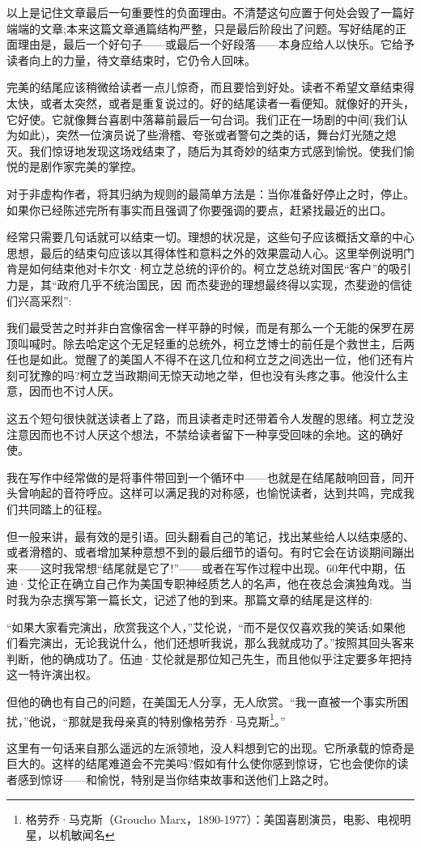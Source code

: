 以上是记住文章最后一句重要性的负面理由。不清楚这句应置于何处会毁了一篇好端端的文章;本来这篇文章通篇结构严整，只是最后阶段出了问题。写好结尾的正面理由是，最后一个好句子——或最后一个好段落——本身应给人以快乐。它给予读者向上的力量，待文章结束时，它仍令人回味。

完美的结尾应该稍微给读者一点儿惊奇，而且要恰到好处。读者不希望文章结束得太快，或者太突然，或者是重复说过的。好的结尾读者一看便知。就像好的开头，它好使。它就像舞台喜剧中落幕前最后一句台词。我们正在一场剧的中间(我们认为如此)，突然一位演员说了些滑稽、夸张或者警句之类的话，舞台灯光随之熄灭。我们惊讶地发现这场戏结束了，随后为其奇妙的结束方式感到愉悦。使我们愉悦的是剧作家完美的掌控。

对于非虚构作者，将其归纳为规则的最简单方法是：当你准备好停止之时，停止。如果你已经陈述完所有事实而且强调了你要强调的要点，赶紧找最近的出口。

经常只需要几句话就可以结束一切。理想的状况是，这些句子应该概括文章的中心思想，最后的结束句应该以其得体性和意料之外的效果震动人心。这里举例说明门肯是如何结束他对卡尔文·柯立芝总统的评价的。柯立芝总统对国民“客户”的吸引力是，其“政府几乎不统治国民，因 而杰斐逊的理想最终得以实现，杰斐逊的信徒们兴高采烈”:

我们最受苦之时并非白宫像宿舍一样平静的时候，而是有那么一个无能的保罗在房顶叫喊时。除去哈定这个无足轻重的总统外，柯立芝博士的前任是个救世主，后两任也是如此。觉醒了的美国人不得不在这几位和柯立芝之间选出一位，他们还有片刻可犹豫的吗?柯立芝当政期间无惊天动地之举，但也没有头疼之事。他没什么主意，因而也不讨人厌。

这五个短句很快就送读者上了路，而且读者走时还带着令人发醒的思绪。柯立芝没注意因而也不讨人厌这个想法，不禁给读者留下一种享受回味的余地。这的确好使。

我在写作中经常做的是将事件带回到一个循环中——也就是在结尾敲响回音，同开头曾响起的音符呼应。这样可以满足我的对称感，也愉悦读者，达到共鸣，完成我们共同踏上的征程。

但一般来讲，最有效的是引语。回头翻看自己的笔记，找出某些给人以结束感的、或者滑稽的、或者增加某种意想不到的最后细节的语句。有时它会在访谈期间蹦出来——这时我常想“结尾就是它了!”——或者在写作过程中出现。60年代中期，伍迪·艾伦正在确立自己作为美国专职神经质艺人的名声，他在夜总会演独角戏。当时我为杂志撰写第一篇长文，记述了他的到来。那篇文章的结尾是这样的:

“如果大家看完演出，欣赏我这个人，”艾伦说，“而不是仅仅喜欢我的笑话;如果他们看完演出，无论我说什么，他们还想听我说，那么我就成功了。”按照其回头客来判断，他的确成功了。伍迪·艾伦就是那位知己先生，而且他似乎注定要多年把持这一特许演出权。

但他的确也有自己的问题，在美国无人分享，无人欣赏。“我一直被一个事实所困扰，”他说，“那就是我母亲真的特别像格劳乔·马克斯\footnote{格劳乔·马克斯（Groucho Marx，1890-1977）：美国喜剧演员，电影、电视明星，以机敏闻名}。”

这里有一句话来自那么遥远的左派领地，没人料想到它的出现。它所承载的惊奇是巨大的。这样的结尾难道会不完美吗?假如有什么使你感到惊讶，它也会使你的读者感到惊讶——和愉悦，特别是当你结束故事和送他们上路之时。